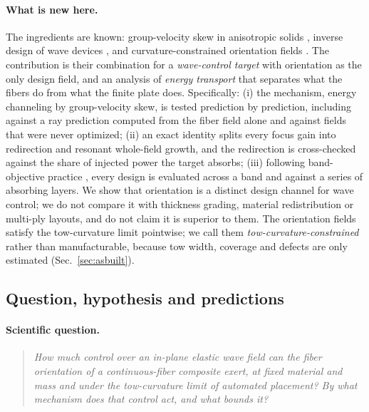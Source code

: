 \paragraph{What is new here.} The ingredients are known: group-velocity skew in anisotropic solids
\cite{auld,chapuis2010}, inverse design of wave devices \cite{sigmund2003,capers2023}, and
curvature-constrained orientation fields \cite{wong2025}. The contribution is their combination for a
\emph{wave-control target} with orientation as the only design field, and an analysis of
\emph{energy transport} that separates what the fibers do from what the finite plate does.
Specifically: (i) the mechanism, energy channeling by group-velocity skew, is tested prediction by
prediction, including against a ray prediction computed from the fiber field alone and against
fields that were never optimized; (ii) an exact identity splits every focus gain into redirection and
resonant whole-field growth, and the redirection is cross-checked against the share of injected power
the target absorbs; (iii) following band-objective practice \cite{jensen2005,andkjaer2013}, every design
is evaluated across a band and against a series of absorbing layers. We show that orientation is a
distinct design channel for wave control; we do not compare it with thickness grading, material
redistribution or multi-ply layouts, and do not claim it is superior to them. The orientation fields satisfy
the tow-curvature limit pointwise; we call them \emph{tow-curvature-constrained} rather than
manufacturable, because tow width, coverage and defects are only estimated (Sec.~\ref{sec:asbuilt}).

\subsection{Question, hypothesis and predictions}\label{sec:qh}
\paragraph{Scientific question.}
\begin{quote}\itshape
How much control over an in-plane elastic wave field can the fiber orientation of a
continuous-fiber composite exert, at fixed material and mass and under the tow-curvature
limit of automated placement? By what mechanism does that control act, and what bounds
it?
\end{quote}

